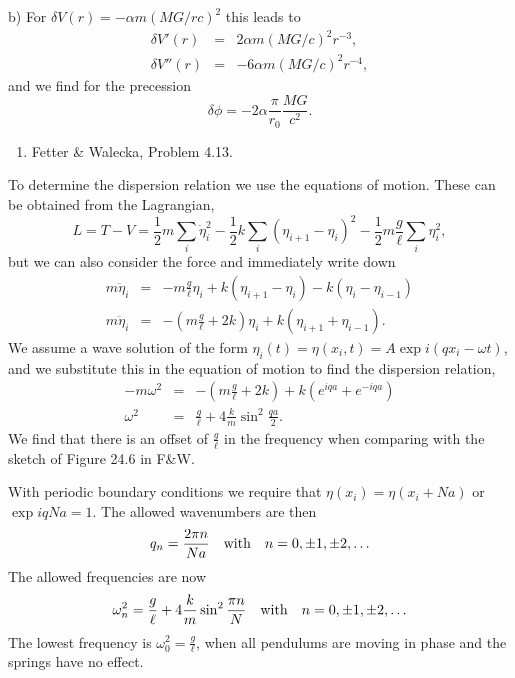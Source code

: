 \documentclass[letterpaper,11pt]{article}
\begin{document}
b) For $\delta V(r) = -\alpha m(MG/rc)^2$ this leads to
\begin{eqnarray*}
 \delta V'(r) & = & 2 \alpha m (MG/c)^2 r^{-3}, \\
 \delta V''(r) & = & - 6 \alpha m (MG/c)^2 r^{-4},
\end{eqnarray*}
and we find for the precession
\begin{equation*}
 \delta\phi = -2 \alpha \frac{\pi}{r_0} \frac{MG}{c^2}.
\end{equation*}


\begin{enumerate}[resume]
 \item Fetter \& Walecka, Problem 4.13.
\end{enumerate}

To determine the dispersion relation we use the equations of motion.  These can be obtained from the Lagrangian,
\begin{equation*}
 L = T - V = \frac{1}{2} m \sum_i \dot\eta_i^2 - \frac{1}{2} k \sum_i (\eta_{i+1} - \eta_i)^2 - \frac{1}{2} m \frac{g}{\ell} \sum_i \eta_i^2,
\end{equation*}
but we can also consider the force and immediately write down
\begin{eqnarray*}
 m \ddot\eta_i & = & - m \frac{g}{\ell} \eta_i + k (\eta_{i+1} - \eta_i) - k (\eta_i - \eta_{i-1}) \\
 m \ddot\eta_i & = & - (m \frac{g}{\ell} + 2 k) \eta_i  + k (\eta_{i+1} + \eta_{i-1}).
\end{eqnarray*}
We assume a wave solution of the form $\eta_i(t) = \eta(x_i,t) = A \exp i(q x_i - \omega t)$, and we substitute this in the equation of motion to find the dispersion relation,
\begin{eqnarray*}
 - m \omega^2 & = & - (m \frac{g}{\ell} + 2 k) + k (e^{iqa} + e^{-iqa}) \\
 \omega^2 & = & \frac{g}{\ell} + 4 \frac{k}{m} \sin^2 \frac{qa}{2}.
\end{eqnarray*}
We find that there is an offset of $\frac{g}{\ell}$ in the frequency when comparing with the sketch of Figure 24.6 in F\&W.

With periodic boundary conditions we require that $\eta(x_i) = \eta(x_i + N a)$ or $\exp iqNa = 1$.  The allowed wavenumbers are then
\begin{equation*}
 q_n = \frac{2 \pi n}{N a} \quad \hbox{with} \quad n = 0, \pm 1, \pm 2, \ldots
\end{equation*}
The allowed frequencies are now
\begin{equation*}
 \omega_n^2 = \frac{g}{\ell} + 4 \frac{k}{m} \sin^2 \frac{\pi n}{N} \quad \hbox{with} \quad n = 0, \pm 1, \pm 2, \ldots
\end{equation*}
The lowest frequency is $\omega_0^2 = \frac{g}{\ell}$, when all pendulums are moving in phase and the springs have no effect.
\end{document}
